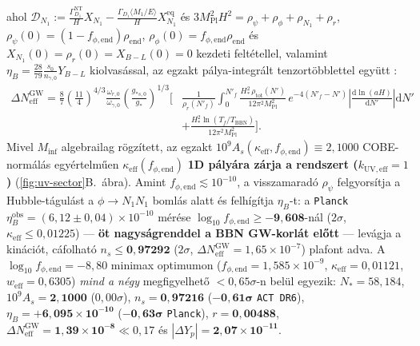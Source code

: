 \documentclass[11pt,a4paper]{article}
\begin{document}
ahol $\mathcal{D}_{N_1} := \frac{\Gamma_{D_1}^{\mathrm{NT}}}{H}X_{N_1} - \frac{\Gamma_{D_1}\langle M_1/E\rangle}{H}X_{N_1}^{\mathrm{eq}}$ és $3M_{\mathrm{Pl}}^2 H^2 = \rho_\psi + \rho_\phi + \rho_{N_1} + \rho_r$, $\rho_\psi(0) = (1-f_{\phi,\mathrm{end}})\rho_{\mathrm{end}}$, $\rho_\phi(0) = f_{\phi,\mathrm{end}}\rho_{\mathrm{end}}$ és $X_{N_1}(0) = \rho_r(0) = X_{B-L}(0) = 0$ kezdeti feltétellel, valamint $\eta_B = \frac{28}{79}\frac{s_0}{n_{\gamma,0}}Y_{B-L}$ kiolvasással, az egzakt pálya-integrált tenzortöbblettel együtt \cite{FigueroaTanin2019}:
\begin{equation}
\begin{aligned}
  \Delta N_{\mathrm{eff}}^{\mathrm{GW}} = \frac{8}{7}\left(\frac{11}{4}\right)^{\!4/3}\frac{\omega_{r,0}}{\omega_{\gamma,0}}\left(\frac{g_{*s,0}}{g_*}\right)^{\!1/3}\Biggl[
  &\frac{1}{\rho_r(N'_f)}\int_0^{N'_f}\frac{H_*^2\,\rho_{\mathrm{tot}}(N')}{12\pi^2 M_{\mathrm{Pl}}^2}\,e^{-4(N'_f - N')}\left|\frac{\mathrm{d}\ln(aH)}{\mathrm{d}N'}\right|\mathrm{d}N' \\
  &+ \frac{H_*^2\ln(T_f/T_{\mathrm{BBN}})}{12\pi^2 M_{\mathrm{Pl}}^2}\Biggr].
\end{aligned}
\label{eq:dneff-gw}
\end{equation}
Mivel $M_{\mathrm{inf}}$ algebrailag rögzített, az egzakt $10^9 A_s(\kappa_{\mathrm{eff}}, f_{\phi,\mathrm{end}}) \equiv 2{,}1000$ COBE-normálás egyértelműen $\kappa_{\mathrm{eff}}(f_{\phi,\mathrm{end}})$ \textbf{1D pályára zárja a rendszert ($k_{\mathrm{UV,eff}} = 1$)} (\ref{fig:uv-sector}B.~ábra). Amint $f_{\phi,\mathrm{end}} \lesssim 10^{-10}$, a visszamaradó $\rho_\psi$ felgyorsítja a Hubble-tágulást a $\phi \to N_1 N_1$ bomlás alatt és felhígítja $\eta_B$-t: a \texttt{Planck} $\eta_B^{\mathrm{obs}} = (6{,}12 \pm 0{,}04)\times 10^{-10}$ mérése $\log_{10} f_{\phi,\mathrm{end}} \ge \mathbf{-9{,}608}$-nál ($2\sigma$, $\kappa_{\mathrm{eff}} \le 0{,}01225$) — \textbf{öt nagyságrenddel a BBN GW-korlát előtt} — levágja a kinációt, cáfolható $n_s \le \mathbf{0{,}97292}$ ($2\sigma$, $\Delta N_{\mathrm{eff}}^{\mathrm{GW}} = 1{,}65\times 10^{-7}$) plafont adva. A $\log_{10} f_{\phi,\mathrm{end}} = -8{,}80$ minimax optimumon ($f_{\phi,\mathrm{end}} = 1{,}585\times 10^{-9}$, $\kappa_{\mathrm{eff}} = 0{,}01121$, $w_{\mathrm{eff}} = 0{,}6305$) \emph{mind a négy} megfigyelhető $<0{,}65\sigma$-n belül egyezik: $N_* = 58{,}184$, $10^9 A_s = \mathbf{2{,}1000}$ ($0{,}00\sigma$), $n_s = \mathbf{0{,}97216}$ ($\mathbf{-0{,}61\sigma}$ {\upshape\texttt{ACT DR6}}), $\eta_B = \mathbf{+6{,}095\times 10^{-10}}$ ($\mathbf{-0{,}63\sigma}$ \texttt{Planck}), $r = \mathbf{0{,}00488}$, $\Delta N_{\mathrm{eff}}^{\mathrm{GW}} = \mathbf{1{,}39\times 10^{-8}} \ll 0{,}17$ és $|\Delta Y_p| = \mathbf{2{,}07\times 10^{-11}}$.
\end{document}
